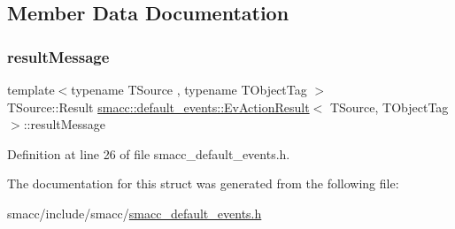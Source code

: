 \subsection{Member Data Documentation}
\mbox{\label{structsmacc_1_1default__events_1_1EvActionResult_a446603e4d43ded6c16a7abba1bf8bfcd}} 
\subsubsection{\texorpdfstring{result\+Message}{resultMessage}}
{\footnotesize\ttfamily template$<$typename T\+Source , typename T\+Object\+Tag $>$ \\
T\+Source\+::\+Result \hyperlink{structsmacc_1_1default__events_1_1EvActionResult}{smacc\+::default\+\_\+events\+::\+Ev\+Action\+Result}$<$ T\+Source, T\+Object\+Tag $>$\+::result\+Message}



Definition at line 26 of file smacc\+\_\+default\+\_\+events.\+h.



The documentation for this struct was generated from the following file\+:\begin{DoxyCompactItemize}
\item 
smacc/include/smacc/\hyperlink{smacc__default__events_8h}{smacc\+\_\+default\+\_\+events.\+h}\end{DoxyCompactItemize}
